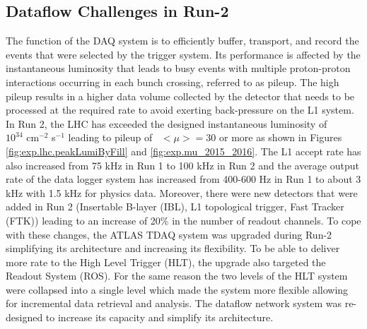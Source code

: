 \subsection{Dataflow Challenges in Run-2}
The function of the DAQ system is to efficiently buffer, transport, and record the events that were selected by the trigger system. 
Its performance is affected by the instantaneous luminosity that leads to busy events with multiple proton-proton interactions occurring in each 
bunch crossing, referred to as pileup. The high pileup results in a higher data volume collected by the detector that needs to be 
processed at the required rate to avoid exerting back-pressure on the L1 system. 
In Run 2, the LHC has exceeded the designed instantaneous luminosity of \\$10^{34}$ cm$^{-2}$ s$^{-1}$ leading to pileup of~ $<\mu>=30$ or more as shown 
in Figures \ref{fig:exp.lhc.peakLumiByFill} and \ref{fig:exp.mu_2015_2016}.
The L1 accept 
rate has also increased from 75 kHz in Run 1 to 100 kHz in Run 2 and the average output rate of the data logger system has 
increased from 400-600 Hz in Run 1 to about 3 kHz with 1.5 kHz for physics data. 
Moreover, there were new detectors that were added in Run 2
(Insertable B-layer (IBL), L1 topological trigger, Fast Tracker (FTK))\cite{Aad:1602235} leading to 
an increase of 20\% in the number of readout channels. 
To cope with these changes, the ATLAS TDAQ system was upgraded during Run-2
simplifying its architecture and increasing its flexibility.
To be able to deliver more rate to the High Level Trigger (HLT), the upgrade also targeted the Readout System (ROS)\cite{PanduroVazquez2016939}. 
For the same reason the two levels of the HLT system were collapsed into a single level which made the system more flexible 
 allowing for incremental data retrieval and analysis. 
The dataflow network system was re-designed to increase its capacity and simplify its architecture\cite{1742-6596-396-1-012033}.

